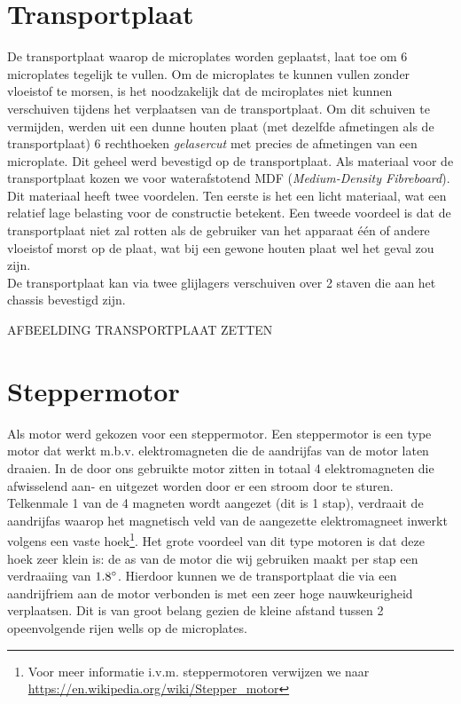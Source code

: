 \documentclass[a4paper,twoside,kulak]{kulakreport} %
\begin{document}
\section{Transportplaat}

De transportplaat waarop de microplates worden geplaatst, laat toe om 6 microplates tegelijk te vullen. Om de microplates te kunnen vullen zonder vloeistof te morsen, is het noodzakelijk dat de mciroplates niet kunnen verschuiven tijdens het verplaatsen van de transportplaat. Om dit schuiven te vermijden, werden uit een dunne houten plaat (met dezelfde afmetingen als de transportplaat) 6 rechthoeken \textit{gelasercut} met precies de afmetingen van een microplate. Dit geheel werd bevestigd op de transportplaat. Als materiaal voor de transportplaat kozen we voor waterafstotend MDF (\textit{Medium-Density Fibreboard}). Dit materiaal heeft twee voordelen. Ten eerste is het een licht materiaal, wat een relatief lage belasting voor de constructie betekent. Een tweede voordeel is dat de transportplaat niet zal rotten als de gebruiker van het apparaat één of andere vloeistof morst op de plaat, wat bij een gewone houten plaat wel het geval zou zijn.  \\
De transportplaat kan via twee glijlagers verschuiven over 2 staven die aan het chassis bevestigd zijn.  

AFBEELDING TRANSPORTPLAAT ZETTEN



\section{Steppermotor}

Als motor werd gekozen voor een steppermotor. Een steppermotor is een type motor dat werkt m.b.v. elektromagneten die de aandrijfas van de motor laten draaien. In de door ons gebruikte motor zitten in totaal 4 elektromagneten die afwisselend aan- en uitgezet worden door er een stroom door te sturen. Telkenmale 1 van de 4 magneten wordt aangezet (dit is 1 stap), verdraait de aandrijfas waarop het magnetisch veld van de aangezette elektromagneet inwerkt volgens een vaste hoek\footnote{Voor meer informatie i.v.m. steppermotoren verwijzen we naar \url{https://en.wikipedia.org/wiki/Stepper_motor}}. Het grote voordeel van dit type motoren is dat deze hoek zeer klein is: de as van de motor die wij gebruiken maakt per stap een verdraaiing van $1.8\degree$. Hierdoor kunnen we de transportplaat die via een aandrijfriem aan de motor verbonden is met een zeer hoge nauwkeurigheid verplaatsen. Dit is van groot belang gezien de kleine afstand tussen 2 opeenvolgende rijen wells op de microplates. 
\end{document}
